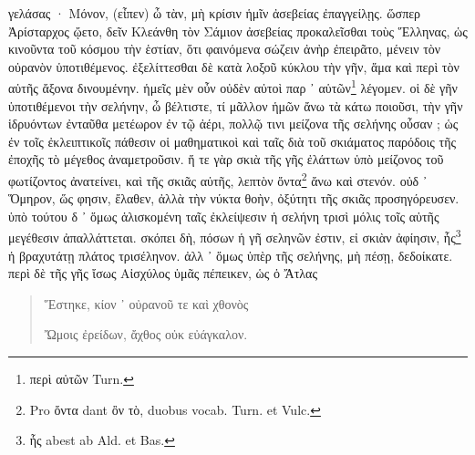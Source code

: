 \documentclass[a4paper, 11pt, oneside, polutonikogreek, german]{article}
\begin{document}
γελάσας · Μόνον, (εἶπεν) ὦ τὰν, μὴ κρίσιν ἡμῖν ἀσεβείας ἐπαγγείλῃς. ὥσπερ Ἀρίσταρχος ᾤετο, δεῖν Κλεάνθη τὸν Σάμιον ἀσεβείας προκαλεῖσθαι τοὺς Ἕλληνας, ὡς κινοῦντα τοῦ κόσμου τὴν ἑστίαν, ὅτι φαινόμενα σώζειν ἀνὴρ ἐπειρᾶτο, μένειν τὸν οὐρανὸν ὑποτιθέμενος. ἐξελίττεσθαι δὲ κατὰ λοξοῦ κύκλου τὴν γῆν, ἅμα καὶ περὶ τὸν αὑτῆς ἄξονα δινουμένην. ἡμεῖς μὲν οὖν οὐδὲν αὐτοὶ παρ ᾽ αὑτῶν\footnote{περὶ αὐτῶν Turn.} λέγομεν. οἱ δὲ γῆν ὑποτιθέμενοι τὴν σελήνην, ὦ βέλτιστε, τί μᾶλλον ἡμῶν ἄνω τὰ κάτω ποιοῦσι, τὴν γῆν ἱδρυόντων ἐνταῦθα μετέωρον ἐν τῷ ἀέρι, πολλῷ τινι μείζονα τῆς σελήνης οὖσαν ; ὡς ἐν τοῖς ἐκλειπτικοῖς πάθεσιν οἱ μαθηματικοὶ καὶ ταῖς διὰ τοῦ σκιάματος παρόδοις τῆς ἐποχῆς τὸ μέγεθος ἀναμετροῦσιν. ἥ τε γὰρ σκιὰ τῆς γῆς ἐλάττων ὑπὸ μείζονος τοῦ φωτίζοντος ἀνατείνει, καὶ τῆς σκιᾶς αὐτῆς, λεπτὸν ὄντα\footnote{Pro ὄντα dant ὂν τὸ, duobus vocab. Turn. et Vulc.} ἄνω καὶ στενόν. οὐδ ᾽ Ὅμηρον, ὥς φησιν, ἔλαθεν, ἀλλὰ τὴν νύκτα θοὴν, ὀξύτητι τῆς σκιᾶς προσηγόρευσεν. ὑπὸ τούτου δ ᾽ ὅμως ἁλισκομένη ταῖς ἐκλείψεσιν ἡ σελήνη τρισὶ μόλις τοῖς αὑτῆς μεγέθεσιν ἀπαλλάττεται. σκόπει δὴ, πόσων ἡ γῆ σεληνῶν ἐστιν, εἰ σκιὰν ἀφίησιν, ἧς\footnote{ἧς abest ab Ald. et Bas.} ἡ βραχυτάτῃ πλάτος τρισέληνον. ἀλλ ᾽ ὅμως ὑπὲρ τῆς σελήνης, μὴ πέσῃ, δεδοίκατε. περὶ δὲ τῆς γῆς ἴσως Αἰσχύλος ὑμᾶς πέπεικεν, ὡς ὁ Ἄτλας
\begin{quotation}
Ἕστηκε, κίον ᾽ οὐρανοῦ τε καὶ χθονὸς

Ὤμοις ἐρείδων, ἄχθος οὐκ εὐάγκαλον.
\end{quotation}
\end{document}
